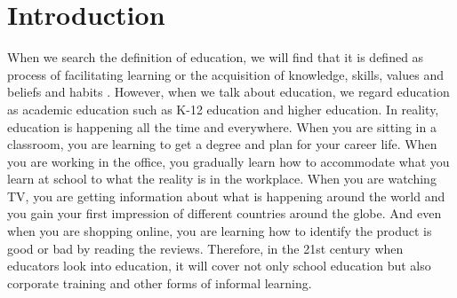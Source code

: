 \documentclass[sigconf]{acmart}
\begin{document}
\section{Introduction}
When we search the definition of education, we will find that it is defined as process of facilitating learning or the acquisition of knowledge, skills, values and beliefs and habits \cite{Wikipedia2017}. However, when we talk about education, we regard education as academic education such as K-12 education and higher education. In reality, education is happening all the time and everywhere. When you are sitting in a classroom, you are learning to get a degree and plan for your career life. When you are working in the office, you gradually learn how to accommodate what you learn at school to what the reality is in the workplace. When you are watching TV, you are getting information about what is happening around the world and you gain your first impression of different countries around the globe. And even when you are shopping online, you are learning how to identify the product is good or bad by reading the reviews. Therefore, in the 21st century when educators look into education, it will cover not only school education but also corporate training and other forms of informal learning. 
\end{document}
